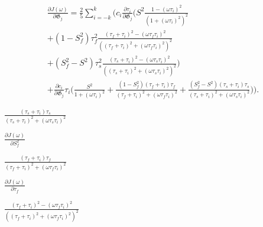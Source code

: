 \documentclass[a4paper,11pt,twoside,openright]{book}
\def\lthtmlcheckvsize{\ifdim\ht\sizebox<\vsize 
  \ifdim\wd\sizebox<\hsize\expandafter\hfill\fi \expandafter\vfill
  \else\expandafter\vss\fi}%
\begin{document}
{\newpage\clearpage
{}%
\begin{multline}
    \frac{\partial J(\omega)}{\partial \mathfrak{G}_j} = \frac{2}{5} \sum_{i=-k}^k \Bigg(
        c_i \frac{\partial \tau_i}{\partial \mathfrak{G}_j} \Bigg(
            S^2 \frac{1 - (\omega \tau_i)^2}{\left(1 + (\omega \tau_i)^2 \right)^2} \\
            + (1 - S^2_f) \tau_f^2 \frac{(\tau_f + \tau_i)^2 - (\omega \tau_f \tau_i)^2}{\left((\tau_f + \tau_i)^2 + (\omega \tau_f \tau_i)^2 \right)^2} \\
            + (S^2_f - S^2) \tau_s^2 \frac{(\tau_s + \tau_i)^2 - (\omega \tau_s \tau_i)^2}{\left((\tau_s + \tau_i)^2 + (\omega \tau_s \tau_i)^2 \right)^2}
        \Bigg) \\
        +  \frac{\partial c_i}{\partial \mathfrak{G}_j} \tau_i \Bigg(
            \frac{S^2}{1 + (\omega \tau_i)^2}
            + \frac{(1 - S^2_f)(\tau_f + \tau_i)\tau_f}{(\tau_f + \tau_i)^2 + (\omega \tau_f \tau_i)^2}
            + \frac{(S^2_f - S^2)(\tau_s + \tau_i)\tau_s}{(\tau_s + \tau_i)^2 + (\omega \tau_s \tau_i)^2}
        \Bigg)
    \Bigg).
\end{multline}%
\lthtmldisplayZ
\lthtmlcheckvsize\clearpage}

{\newpage\clearpage
{}%
$\displaystyle {\frac{{(\tau_s + \tau_i)\tau_s}}{{(\tau_s + \tau_i)^2 + (\omega \tau_s \tau_i)^2}}}$%
\lthtmlindisplaymathZ
\lthtmlcheckvsize\clearpage}

{\newpage\clearpage
{}%
$\displaystyle {\frac{{\partial J(\omega)}}{{\partial S^2_f}}}$%
\lthtmlindisplaymathZ
\lthtmlcheckvsize\clearpage}

{\newpage\clearpage
{}%
$\displaystyle {\frac{{(\tau_f + \tau_i)\tau_f}}{{(\tau_f + \tau_i)^2 + (\omega \tau_f \tau_i)^2}}}$%
\lthtmlindisplaymathZ
\lthtmlcheckvsize\clearpage}

{\newpage\clearpage
{}%
$\displaystyle {\frac{{\partial J(\omega)}}{{\partial \tau_f}}}$%
\lthtmlindisplaymathZ
\lthtmlcheckvsize\clearpage}

{\newpage\clearpage
{}%
$\displaystyle {\frac{{(\tau_f + \tau_i)^2 - (\omega \tau_f \tau_i)^2}}{{\left((\tau_f + \tau_i)^2 + (\omega \tau_f \tau_i)^2 \right)^2}}}$%
\lthtmlindisplaymathZ
\lthtmlcheckvsize\clearpage}
\end{document}
